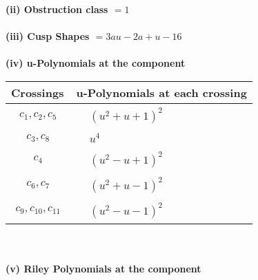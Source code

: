 \documentclass[1p]{elsarticle_modified}
\theoremstyle{definition}
\begin{document}
\flushleft \textbf{(ii) Obstruction class $= 1$}\\~\\
\flushleft \textbf{(iii) Cusp Shapes $= 3 a u-2 a+u-16$}\\~\\
\newpage\renewcommand{\arraystretch}{1}
\flushleft \textbf{(iv) u-Polynomials at the component}\newline \\
\begin{tabular}{m{50pt}|m{274pt}}
Crossings & \hspace{64pt}u-Polynomials at each crossing \\
\hline $$\begin{aligned}c_{1},c_{2},c_{5}\end{aligned}$$&$\begin{aligned}
&(u^2+u+1)^2
\end{aligned}$\\
\hline $$\begin{aligned}c_{3},c_{8}\end{aligned}$$&$\begin{aligned}
&u^4
\end{aligned}$\\
\hline $$\begin{aligned}c_{4}\end{aligned}$$&$\begin{aligned}
&(u^2- u+1)^2
\end{aligned}$\\
\hline $$\begin{aligned}c_{6},c_{7}\end{aligned}$$&$\begin{aligned}
&(u^2+u-1)^2
\end{aligned}$\\
\hline $$\begin{aligned}c_{9},c_{10},c_{11}\end{aligned}$$&$\begin{aligned}
&(u^2- u-1)^2
\end{aligned}$\\
\hline
\end{tabular}\\~\\
\newpage\renewcommand{\arraystretch}{1}
\flushleft \textbf{(v) Riley Polynomials at the component}\newline \\
\end{document}
